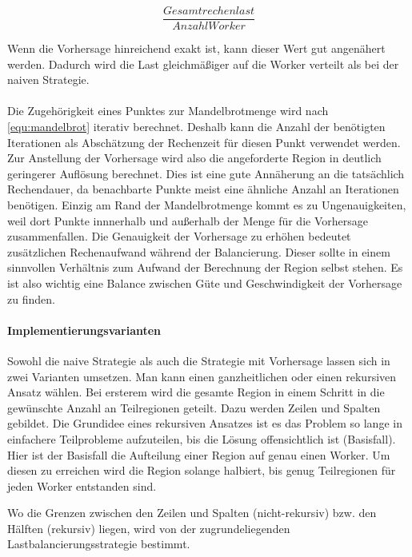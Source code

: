\begin{equation}\label{equ:desiredN}
	\frac{Gesamtrechenlast}{AnzahlWorker}
\end{equation}

Wenn die Vorhersage hinreichend exakt ist, kann dieser Wert gut angenähert werden.
Dadurch wird die Last gleichmäßiger auf die Worker verteilt als bei der naiven Strategie.

\paragraph*{}\label{par:load_balancing_prediction}
Die Zugehörigkeit eines Punktes zur Mandelbrotmenge wird nach \autoref{equ:mandelbrot} iterativ berechnet.
Deshalb kann die Anzahl der benötigten Iterationen als Abschätzung der Rechenzeit für diesen Punkt verwendet werden.
Zur Anstellung der Vorhersage wird also die angeforderte Region in deutlich geringerer Auflösung berechnet.
Dies ist eine gute Annäherung an die tatsächlich Rechendauer, da benachbarte Punkte meist eine ähnliche Anzahl an Iterationen benötigen.
Einzig am Rand der Mandelbrotmenge kommt es zu Ungenauigkeiten, weil dort Punkte innnerhalb und außerhalb der Menge für die Vorhersage zusammenfallen.
Die Genauigkeit der Vorhersage zu erhöhen bedeutet zusätzlichen Rechenaufwand während der Balancierung.
Dieser sollte in einem sinnvollen Verhältnis zum Aufwand der Berechnung der Region selbst stehen.
Es ist also wichtig eine Balance zwischen Güte und Geschwindigkeit der Vorhersage zu finden.

\paragraph{Implementierungsvarianten}
Sowohl die naive Strategie als auch die Strategie mit Vorhersage lassen sich in zwei Varianten umsetzen.
Man kann einen ganzheitlichen oder einen rekursiven Ansatz wählen.
Bei ersterem wird die gesamte Region in einem Schritt in die gewünschte Anzahl an Teilregionen geteilt.
Dazu werden Zeilen und Spalten gebildet.
Die Grundidee eines rekursiven Ansatzes ist es das Problem so lange in einfachere Teilprobleme aufzuteilen, bis die Lösung offensichtlich ist (Basisfall).
Hier ist der Basisfall die Aufteilung einer Region auf genau einen Worker.
Um diesen zu erreichen wird die Region solange halbiert, bis genug Teilregionen für jeden Worker entstanden sind.

Wo die Grenzen zwischen den Zeilen und Spalten (nicht-rekursiv) bzw. den Hälften (rekursiv) liegen, wird von der zugrundeliegenden Lastbalancierungsstrategie bestimmt.

